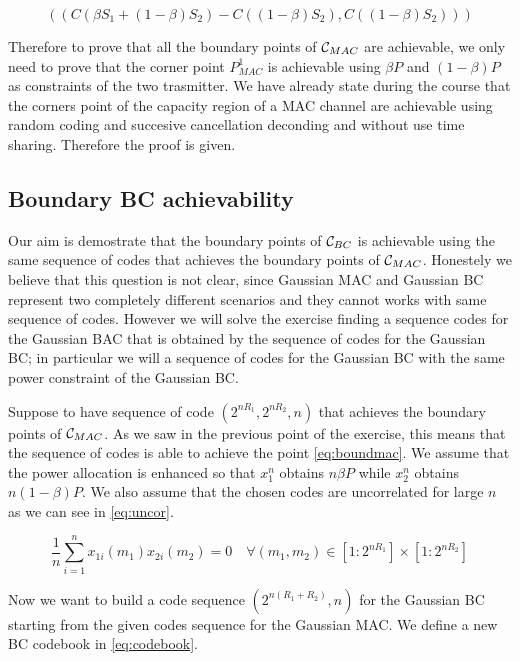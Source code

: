 \begin{equation}
	(\left( C (\beta S_1 + (1-\beta)S_2) - C((1-\beta)S_2) , C \left( (1-\beta)S_2 \right) \right))
	\label{eq:boundmac}
\end{equation}

Therefore to prove that all the boundary points of $\mathcal{C}_{MAC}$ are achievable, we only need to prove that the corner point $P_{MAC}^1$ is achievable using $\beta P$ and $(1-\beta) P$ as constraints of the two trasmitter. We have already state during the course that the corners point of the capacity region of a MAC channel are achievable using random coding and succesive cancellation deconding and without use time sharing. Therefore the proof is given.

\subsection{Boundary BC achievability}

Our aim is demostrate that the boundary points of $\mathcal{C}_{BC}$ is achievable using the same sequence of codes that achieves the boundary points of $\mathcal{C}_{MAC}$. Honestely we believe that this question is not clear, since Gaussian MAC and Gaussian BC represent two completely different scenarios and they cannot works with same sequence of codes. However we will solve the exercise finding a sequence codes for the Gaussian BAC that is obtained by the sequence of codes for the Gaussian BC; in particular we will a sequence of codes for the Gaussian BC with the same power constraint of the  Gaussian BC.


Suppose to have sequence of code $(2^{nR_1}, 2^{nR_2}, n)$ that achieves the boundary points of $\mathcal{C}_{MAC}$. As we saw in the previous point of the exercise, this means that the sequence of codes is able to achieve the point \eqref{eq:boundmac}. We assume that the power allocation is enhanced so that $x_1^n$ obtains $n \beta P$ while $x_2^n$ obtains $n (1-\beta) P$. We also assume that the chosen codes are uncorrelated for large $n$ as we can see in \eqref{eq:uncor}.

\begin{equation}
	\frac{1}{n}\sum_{i=1}^n x_{1i}(m_1) x_{2i} (m_2)= 0 \quad \forall (m_1,m_2) \in [1:2^{nR_1}]\times[1:2^{nR_2}]
	\label{eq:uncor}
\end{equation}

Now we want to build a code sequence $(2^{n(R_1+R_2)},n)$ for the Gaussian BC starting from the given codes sequence for the Gaussian MAC. We define a new BC codebook in \eqref{eq:codebook}.

